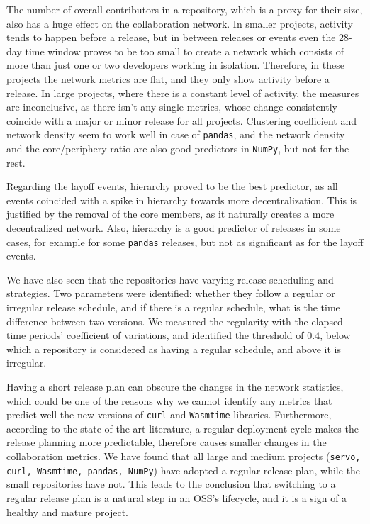 The number of overall contributors in a repository, which is a proxy for their size, also has a huge effect on the collaboration network. In smaller projects, activity tends to happen before a release, but in between releases or events even the 28-day time window proves to be too small to create a network which consists of more than just one or two developers working in isolation. Therefore, in these projects the network metrics are flat, and they only show activity before a release. In large projects, where there is a constant level of activity, the measures are inconclusive, as there isn't any single metrics, whose change consistently coincide with a major or minor release for all projects. Clustering coefficient and network density seem to work well in case of \texttt{pandas}, and the network density and the core/periphery ratio are also good predictors in \texttt{NumPy}, but not for the rest.

Regarding the layoff events, hierarchy proved to be the best predictor, as all events coincided with a spike in hierarchy towards more decentralization. This is justified by the removal of the core members, as it naturally creates a more decentralized network. Also, hierarchy is a good predictor of releases in some cases, for example for some \texttt{pandas} releases, but not as significant as for the layoff events.

We have also seen that the repositories have varying release scheduling and strategies. Two parameters were identified: whether they follow a regular or irregular release schedule, and if there is a regular schedule, what is the time difference between two versions. We measured the regularity with the elapsed time periods' coefficient of variations, and identified the threshold of $0.4$, below which a repository is considered as having a regular schedule, and above it is irregular.

Having a short release plan can obscure the changes in the network statistics, which could be one of the reasons why we cannot identify any metrics that predict well the new versions of \texttt{curl} and \texttt{Wasmtime} libraries. Furthermore, according to the state-of-the-art literature, a regular deployment cycle makes the release planning more predictable, therefore causes smaller changes in the collaboration metrics. We have found that all large and medium projects (\texttt{servo, curl, Wasmtime, pandas, NumPy}) have adopted a regular release plan, while the small repositories have not. This leads to the conclusion that switching to a regular release plan is a natural step in an OSS's lifecycle, and it is a sign of a healthy and mature project. \\

